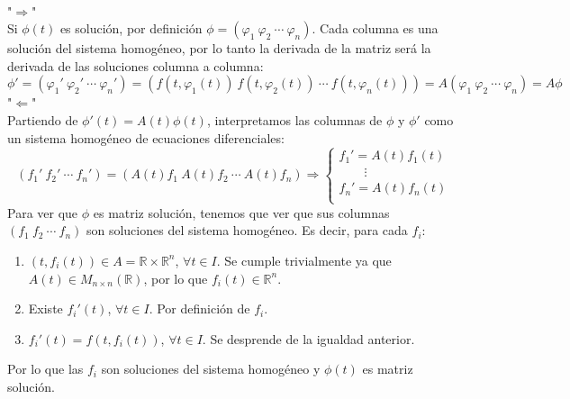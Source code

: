 \documentclass[11pt, a4paper,twoside]{article}
\makeatletter
\theoremstyle{theorem-style}  %
\renewenvironment{proof}[1][\proofname]{\par
	\pushQED{\qed}%
	\normalfont \topsep6\p@\@plus6\p@\relax
	\list{}{%
		\settowidth{\leftmargin}{\quad:\hskip\labelsep}%
		\setlength{\labelwidth}{0pt}%
		\setlength{\itemindent}{-\leftmargin}%
	}%
	\item[\hskip\labelsep\itshape#1\@addpunct{:}]\ignorespaces
}{%
	\popQED\endlist\@endpefalse
}
\theoremstyle{definition-style}
\theoremstyle{example-style}
\makeatother
\begin{document}
\begin{proof}\ \\
	"$\Rightarrow $"\\
	Si $ \phi(t) $ es solución, por definición $ \phi=(\varphi_1 \ \varphi_2\  \cdots\  \varphi_n) $. Cada columna es una solución del sistema homogéneo, por lo tanto la derivada de la matriz será la derivada de las soluciones columna a columna:
	\[ \phi' = (\varphi_1' \ \varphi_2'\  \cdots\  \varphi_n')=(f(t,\varphi_1(t)) \ f(t,\varphi_2(t))\  \cdots\  f(t,\varphi_n(t)))=A(\varphi_1 \ \varphi_2\  \cdots\  \varphi_n)=A\phi \]
	"$\Leftarrow $"\\
	Partiendo de $ \phi'(t)=A(t)\phi(t) $, interpretamos las columnas de $ \phi $ y $ \phi' $ como un sistema homogéneo de ecuaciones diferenciales:
	\[ (f_1' \ f_2'\  \cdots\  f_n')=(A(t)f_1 \ A(t)f_2\  \cdots\  A(t)f_n)\Rightarrow \begin{cases}
	f_1'=A(t)f_1(t)\\
	\qquad \vdots\\
	f_n'=A(t)f_n(t)\\
	\end{cases} \]
	Para ver que $ \phi $ es matriz solución, tenemos que ver que sus columnas $ (f_1 \ f_2\  \cdots\  f_n) $ son soluciones del sistema homogéneo. Es decir, para cada $ f_i $:
	\begin{enumerate}[\quad i)]
		\item $(t, f_i (t)) \in A=\mathbb{R}\times \mathbb{R}^n$, $\forall t \in I$. Se cumple trivialmente ya que $ A(t)\in M_{n \times n} (\mathbb{R}) $, por lo que $ f_i(t)\in \mathbb{R}^n $.
		\item Existe $ f_i' (t)$, $\forall t \in I$. Por definición de $ f_i $.
		\item $f_i'(t)=f(t, f_i(t))$,  $\forall t \in I$. Se desprende de la igualdad anterior.
	\end{enumerate}
	Por lo que las $ f_i $ son soluciones del sistema homogéneo y $ \phi(t) $ es matriz solución.
\end{proof}
\end{document}
